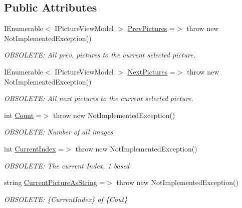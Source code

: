 \subsection*{Public Attributes}
\begin{DoxyCompactItemize}
\item 
I\+Enumerable$<$ I\+Picture\+View\+Model $>$ \mbox{\hyperlink{class_pic_d_b_1_1_view_models_1_1_picture_list_view_model_a7654958cbb50de3340aab1ffe55b06c6}{Prev\+Pictures}} =$>$ throw new Not\+Implemented\+Exception()
\begin{DoxyCompactList}\small\item\em O\+B\+S\+O\+L\+E\+TE\+: All prev. pictures to the current selected picture. \end{DoxyCompactList}\item 
I\+Enumerable$<$ I\+Picture\+View\+Model $>$ \mbox{\hyperlink{class_pic_d_b_1_1_view_models_1_1_picture_list_view_model_ac36598fb76dbcd1e2575fb97ff88a8c8}{Next\+Pictures}} =$>$ throw new Not\+Implemented\+Exception()
\begin{DoxyCompactList}\small\item\em O\+B\+S\+O\+L\+E\+TE\+: All next pictures to the current selected picture. \end{DoxyCompactList}\item 
int \mbox{\hyperlink{class_pic_d_b_1_1_view_models_1_1_picture_list_view_model_a935c7dd0503680824191cf2bf70c24e5}{Count}} =$>$ throw new Not\+Implemented\+Exception()
\begin{DoxyCompactList}\small\item\em O\+B\+S\+O\+L\+E\+TE\+: Number of all images \end{DoxyCompactList}\item 
int \mbox{\hyperlink{class_pic_d_b_1_1_view_models_1_1_picture_list_view_model_acbfd6df123842b3434df4e734aa1a4c8}{Current\+Index}} =$>$ throw new Not\+Implemented\+Exception()
\begin{DoxyCompactList}\small\item\em O\+B\+S\+O\+L\+E\+TE\+: The current Index, 1 based \end{DoxyCompactList}\item 
string \mbox{\hyperlink{class_pic_d_b_1_1_view_models_1_1_picture_list_view_model_ae7a8aacd98a0fdd5839c5c4b39e2263e}{Current\+Picture\+As\+String}} =$>$ throw new Not\+Implemented\+Exception()
\begin{DoxyCompactList}\small\item\em O\+B\+S\+O\+L\+E\+TE\+: \{Current\+Index\} of \{Cout\} \end{DoxyCompactList}\end{DoxyCompactItemize}
